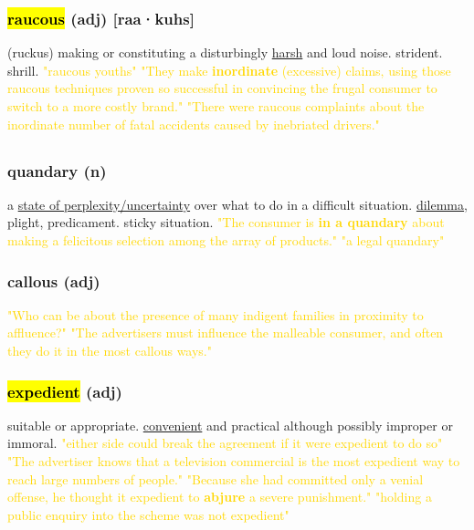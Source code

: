 \documentclass{proc}
\begin{document}
	\subsubsection{\textcolor{brickred}{\hl{raucous}} (adj) [raa·kuhs]}
	(ruckus) making or constituting a disturbingly \underline{harsh} and loud noise. strident. shrill.
	\textcolor{gold}{"raucous youths" "They make \textbf{inordinate} (excessive) claims, using those raucous techniques proven so successful in convincing the frugal consumer to switch to a more costly brand." "There were raucous complaints about the inordinate number of fatal accidents caused by inebriated drivers."}
	
	\newpage
	\setcounter{section}{42}
	\setcounter{subsection}{0}
	
	
	\subsection{}
	\subsubsection{\textcolor{brickred}{quandary} (n)}
	a \underline{state of perplexity/uncertainty} over what to do in a difficult situation. \underline{dilemma}, plight, predicament. sticky situation.
	\textcolor{gold}{"The consumer is \textbf{in a quandary} about making a felicitous selection among the array of products." "a legal quandary"}
	
	\subsubsection{\textcolor{brickred}{callous} (adj)} %
	\textcolor{gold}{"Who can be about the presence of many indigent families in proximity to affluence?" "The advertisers must influence the malleable consumer, and often they do it in the most callous ways."}
	
	\subsubsection{\textcolor{brickred}{\hl{expedient}} (adj)}
	suitable or appropriate. \underline{convenient} and practical although possibly improper or immoral.
	\textcolor{gold}{"either side could break the agreement if it were expedient to do so" "The advertiser knows that a television commercial is the most expedient way to reach large numbers of people." "Because she had committed only a venial offense, he thought it expedient to \textbf{abjure} a severe punishment." "holding a public enquiry into the scheme was not expedient"}
	
\end{document}
